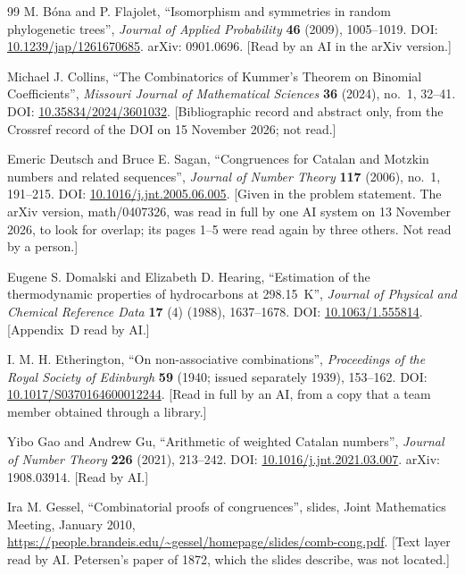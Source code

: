 \documentclass[11pt]{article}
\theoremstyle{definition}
\theoremstyle{remark}
\numberwithin{equation}{section}
\numberwithin{figure}{section}
\begin{document}
\begin{thebibliography}{99}
M. B\'ona and P. Flajolet, ``Isomorphism and symmetries in random phylogenetic trees'', \emph{Journal of
Applied Probability} \textbf{46} (2009), 1005--1019. DOI:
\href{https://doi.org/10.1239/jap/1261670685}{10.1239/jap/1261670685}. arXiv: 0901.0696. [Read by an AI in
the arXiv version.]

Michael J. Collins, ``The Combinatorics of Kummer's Theorem on Binomial Coefficients'', \emph{Missouri
Journal of Mathematical Sciences} \textbf{36} (2024), no.~1, 32--41. DOI:
\href{https://doi.org/10.35834/2024/3601032}{10.35834/2024/3601032}. [Bibliographic record and abstract
only, from the Crossref record of the DOI on 15 November 2026; not read.]

Emeric Deutsch and Bruce E. Sagan, ``Congruences for Catalan and Motzkin numbers and related sequences'',
\emph{Journal of Number Theory} \textbf{117} (2006), no.~1, 191--215. DOI:
\href{https://doi.org/10.1016/j.jnt.2005.06.005}{10.1016/j.jnt.2005.06.005}. [Given in the problem statement.
The arXiv version, math/0407326, was read in full by one AI system on 13 November 2026, to look for overlap;
its pages 1--5 were read again by three others. Not read by a person.]

Eugene S. Domalski and Elizabeth D. Hearing, ``Estimation of the thermodynamic properties of hydrocarbons at
298.15~K'', \emph{Journal of Physical and Chemical Reference Data} \textbf{17} (4) (1988), 1637--1678. DOI:
\href{https://doi.org/10.1063/1.555814}{10.1063/1.555814}. [Appendix~D read by AI.]

I. M. H. Etherington, ``On non-associative combinations'', \emph{Proceedings of the Royal Society of
Edinburgh} \textbf{59} (1940; issued separately 1939), 153--162. DOI:
\href{https://doi.org/10.1017/S0370164600012244}{10.1017/S0370164600012244}. [Read in full by an AI, from a
copy that a team member obtained through a library.]

Yibo Gao and Andrew Gu, ``Arithmetic of weighted Catalan numbers'', \emph{Journal of Number Theory}
\textbf{226} (2021), 213--242. DOI: \href{https://doi.org/10.1016/j.jnt.2021.03.007}{10.1016/j.jnt.2021.03.007}.
arXiv: 1908.03914. [Read by AI.]

Ira M. Gessel, ``Combinatorial proofs of congruences'', slides, Joint Mathematics Meeting, January 2010,
\url{https://people.brandeis.edu/~gessel/homepage/slides/comb-cong.pdf}. [Text layer read by AI. Petersen's
paper of 1872, which the slides describe, was not located.]


\end{thebibliography}
\end{document}
